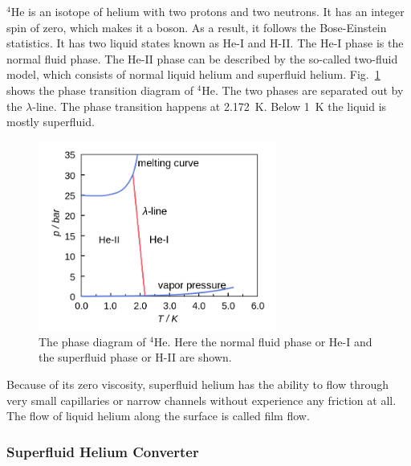 $^4$He is an isotope of helium with two protons and two neutrons. It
has an integer spin of zero, which makes it a boson. As a result, it
follows the Bose-Einstein statistics. It has two liquid states known
as He-I and H-II. The He-I phase is the normal fluid phase. The He-II
phase can be described by the so-called two-fluid model, which
consists of normal liquid helium and superfluid helium.
Fig.~\ref{fig:phasetransition} shows the phase transition diagram of
$^4$He. The two phases are separated out by the $\lambda$-line. The
phase transition happens at 2.172~K. Below 1~K the liquid is mostly
superfluid.

\begin{figure}[h!]
  \centering \includegraphics[width=0.7\textwidth]{phasetransition.png}
  \caption{The phase diagram of $^4$He. Here the normal fluid phase or
    He-I and the superfluid phase or H-II are shown.}
\label{fig:phasetransition}
\end{figure}

Because of its zero viscosity, superfluid helium has the ability to
flow through very small capillaries or narrow channels without
experience any friction at all. The flow of liquid helium along the
surface is called film flow.


\subsubsection{Superfluid Helium Converter}

